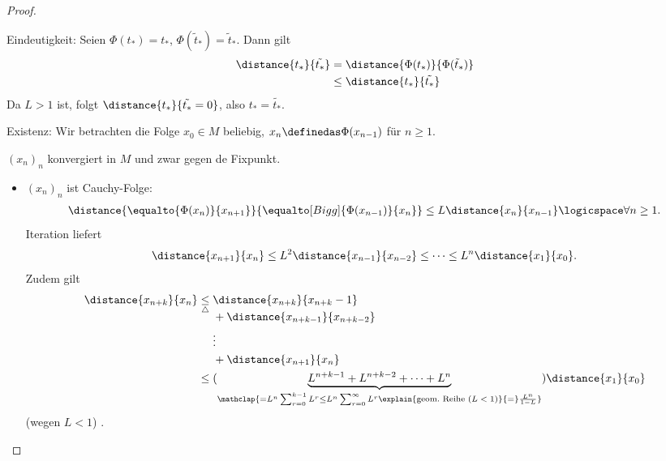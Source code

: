 \begin{proof}
    \begin{proofdescription}
        \item[Eindeutigkeit:] Seien \( \Phi(t_*)=t_*\), \( \Phi(\tilde{t}_*)=\tilde{t}_* \). Dann gilt
        \begin{align*}
            \distance{t_*}{\tilde{t_*} }\begin{aligned}[t]
                &=\distance{\Phi(t_*)}{\Phi(\tilde{t}_*)}\\
                &\leq \distance{t_*}{\tilde{t_*} }
            \end{aligned}
        \end{align*} 
        Da \( L>1\) ist, folgt \( \distance{t_*}{\tilde{t_*}=0 }\), also \( t_*=\tilde{t_*} \).
        \item[Existenz:] Wir betrachten die Folge \( x_0\in M\) beliebig, \( x_n\definedas \Phi(x_{n-1})\) für \( n\geq 1\).
        \begin{behauptung*}
            \( (x_n)_n\) konvergiert in \( M\)  und zwar gegen de Fixpunkt.
        \end{behauptung*}
        \begin{subproof}
            \begin{itemize}
                \item \( (x_n)_n\) ist Cauchy-Folge:
                \begin{align*}
                    \distance{\equalto{\Phi(x_n)}{x_{n+1}}}{\equalto[Bigg]{\Phi(x_{n-1})}{x_n}}\leq L \distance{x_n}{x_{n-1}}\logicspace \forall n\geq 1.
                \end{align*}
                Iteration liefert
                \begin{align*}
                    \distance{x_{n+1}}{x_n}\leq L^2 \distance{x_{n-1}}{x_{n-2}}\leq \cdots \leq L^n \distance{x_1}{x_0}.
                \end{align*}
                Zudem gilt
                \begin{align*}
                    \distance{x_{n+k}}{x_n}\begin{aligned}[t]
                        &\underset{\triangle}{\leq}\begin{aligned}[t]
                            &\distance{x_{n+k}}{x_{n+k}-1}\\
                            &+\distance{x_{n+k-1}}{x_{n+k-2}}\\
                            &\vdots\\
                            &+\distance{x_{n+1}}{x_n}
                        \end{aligned}\\
                        &\leq (\underbrace{L^{n+k-1}+L^{n+k-2}+\cdots+L^n}_{\mathclap{=L^n \sum_{r=0}^{k-1} L^r\leq L^n \sum_{r=0}^{\infty} L^r\explain{\text{geom.\ Reihe (\( L<1\))}}{=}\frac{L^n}{1-L}}})\distance{x_1}{x_0}
                    \end{aligned}
                \end{align*}
                \timplies (wegen \( L<1\)) \Beh.
                

\end{itemize}
\end{subproof}
\end{proofdescription}
\end{proof}
